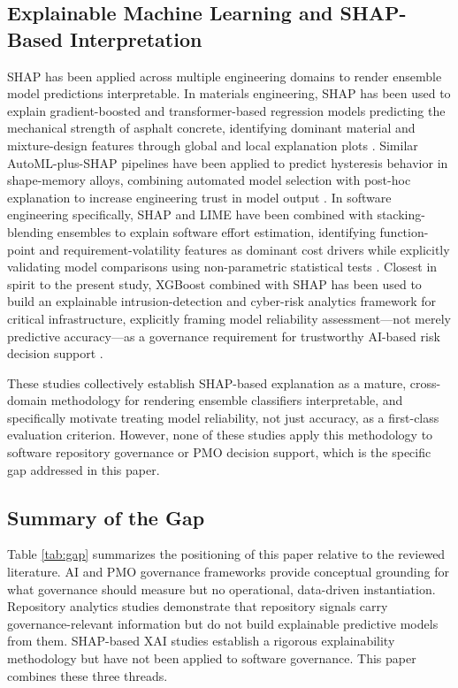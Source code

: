 \documentclass[conference]{IEEEtran}
\begin{document}
\subsection{Explainable Machine Learning and SHAP-Based Interpretation}

SHAP has been applied across multiple engineering domains to render ensemble model
predictions interpretable. In materials engineering, SHAP has been used to explain
gradient-boosted and transformer-based regression models predicting the mechanical
strength of asphalt concrete, identifying dominant material and mixture-design features
through global and local explanation plots \cite{ref10}. Similar AutoML-plus-SHAP
pipelines have been applied to predict hysteresis behavior in shape-memory alloys,
combining automated model selection with post-hoc explanation to increase engineering
trust in model output \cite{ref11}. In software engineering specifically, SHAP and LIME
have been combined with stacking-blending ensembles to explain software effort
estimation, identifying function-point and requirement-volatility features as dominant
cost drivers while explicitly validating model comparisons using non-parametric
statistical tests \cite{ref12}. Closest in spirit to the present study, XGBoost combined
with SHAP has been used to build an explainable intrusion-detection and cyber-risk
analytics framework for critical infrastructure, explicitly framing model reliability
assessment---not merely predictive accuracy---as a governance requirement for
trustworthy AI-based risk decision support \cite{ref13}.

These studies collectively establish SHAP-based explanation as a mature, cross-domain
methodology for rendering ensemble classifiers interpretable, and specifically motivate
treating model reliability, not just accuracy, as a first-class evaluation criterion.
However, none of these studies apply this methodology to software repository governance
or PMO decision support, which is the specific gap addressed in this paper.

\subsection{Summary of the Gap}

Table \ref{tab:gap} summarizes the positioning of this paper relative to the reviewed
literature. AI and PMO governance frameworks \cite{ref1,ref2,ref3,ref4,ref5,ref6,ref7,ref8,ref9}
provide conceptual grounding for what governance should measure but no operational,
data-driven instantiation. Repository analytics studies \cite{ref14} demonstrate that
repository signals carry governance-relevant information but do not build explainable
predictive models from them. SHAP-based XAI studies \cite{ref10,ref11,ref12,ref13}
establish a rigorous explainability methodology but have not been applied to software
governance. This paper combines these three threads.
\end{document}
